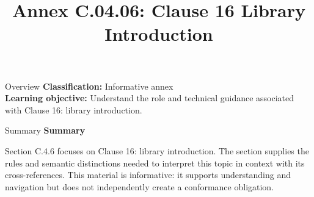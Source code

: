 \documentclass[10pt,letterpaper]{article}
\title{Annex C.04.06: Clause 16 Library Introduction}
\author{}
\date{}
\begin{document}
\maketitle
\begin{CornellOverviewBox}{Overview}
\textbf{Classification:} Informative annex\\[2pt]
\textbf{Learning objective:} Understand the role and technical guidance associated with Clause 16: library introduction.
\end{CornellOverviewBox}\begin{CornellSummaryBox}{Summary}
{\sffamily\bfseries\color{Accent} Summary}\par\vspace{3pt}Section C.4.6 focuses on Clause 16: library introduction. The section supplies the rules and semantic distinctions needed to interpret this topic in context with its cross-references. This material is informative: it supports understanding and navigation but does not independently create a conformance obligation.
\end{CornellSummaryBox}
\end{document}
